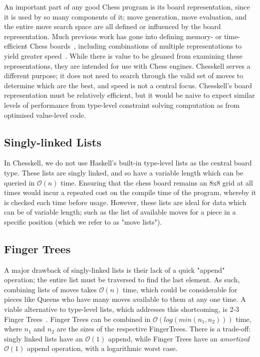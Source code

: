 An important part of any good Chess program is its board representation, since it is used by so many components of it; move generation, move evaluation, and the entire move search space are all defined or influenced by the board representation. Much previous work has gone into defining memory- or time-efficient Chess boards~\cite{bitboard,searchtables}, including combinations of multiple representations to yield greater speed~\cite{bitandccr}. While there is value to be gleaned from examining these representations, they are intended for use with Chess engines. Chesskell serves a different purpose; it does not need to search through the valid set of moves to determine which are the best, and speed is not a central focus. Chesskell's board representation must be relatively efficient, but it would be naive to expect similar levels of performance from type-level constraint solving computation as from optimised value-level code.

\subsection{Singly-linked Lists}

In Chesskell, we do not use Haskell's built-in type-level lists as the central board type. These lists are singly linked, and so have a variable length which can be queried in $\mathcal{O}(n)$ time. Ensuring that the chess board remains an 8x8 grid at all times would incur a repeated cost on the compile time of the program, whereby it is checked each time before usage. However, these lists are ideal for data which can be of variable length; such as the list of available moves for a piece in a specific position (which we refer to as "move lists").

\subsection{Finger Trees} \label{fingertreedesign}

A major drawback of singly-linked lists is their lack of a quick "append" operation; the entire list must be traversed to find the last element. As such, combining lists of moves takes $\mathcal{O}(n)$ time, which could be considerable for pieces like Queens who have many moves available to them at any one time. A viable alternative to type-level lists, which addresses this shortcoming, is 2-3 Finger Trees~\cite{fingertrees}. Finger Trees can be combined in $\mathcal{O}(log(min(n_{1}, n_{2})))$ time, where $n_{1}$ and $n_{2}$ are the sizes of the respective FingerTrees. There is a trade-off: singly linked lists have an $\mathcal{O}(1)$ append, while Finger Trees have an \emph{amortized} $\mathcal{O}(1)$ append operation, with a logarithmic worst case.

